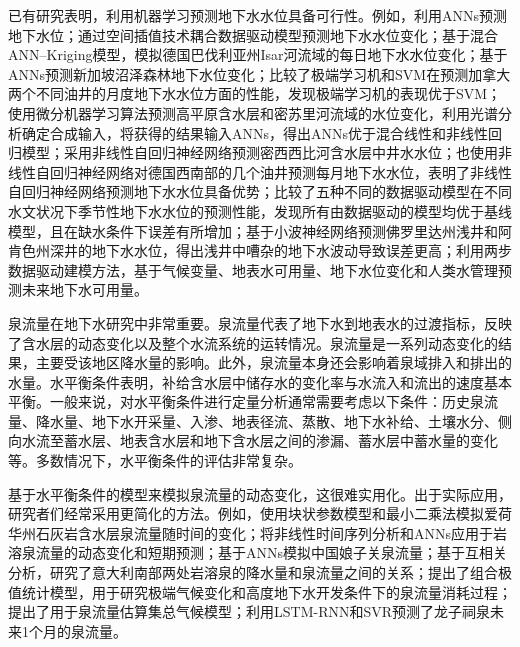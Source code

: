 已有研究表明，利用机器学习预测地下水水位具备可行性。例如，\citet{coppola2003artificial}利用ANNs预测地下水位；\citet{sun2013predicting}通过空间插值技术耦合数据驱动模型预测地下水水位变化；\citet{tapoglou2014spatio}基于混合ANN--Kriging模型，模拟德国巴伐利亚州Isar河流域的每日地下水水位变化；\citet{Sun2015Technical}基于ANNs预测新加坡沼泽森林地下水位变化；\citet{yadav2017assessing}比较了极端学习机和SVM在预测加拿大两个不同油井的月度地下水水位方面的性能，发现极端学习机的表现优于SVM；\citet{sahoo2017machine}使用微分机器学习算法预测高平原含水层和密苏里河流域的水位变化，利用光谱分析确定合成输入，将获得的结果输入ANNs，得出ANNs优于混合线性和非线性回归模型；\citet{guzman2017use}采用非线性自回归神经网络预测密西西比河含水层中井水水位；\citet{wunsch2018forecasting}也使用非线性自回归神经网络对德国西南部的几个油井预测每月地下水水位，表明了非线性自回归神经网络预测地下水水位具备优势；\citet{amaranto2018semi}比较了五种不同的数据驱动模型在不同水文状况下季节性地下水水位的预测性能，发现所有由数据驱动的模型均优于基线模型，且在缺水条件下误差有所增加；\citet{Rakhshandehroo2018Long}基于小波神经网络预测佛罗里达州浅井和阿肯色州深井的地下水水位，得出浅井中嘈杂的地下水波动导致误差更高；\citet{amaranto2019spatially}利用两步数据驱动建模方法，基于气候变量、地表水可用量、地下水位变化和人类水管理预测未来地下水可用量。

泉流量在地下水研究中非常重要\citep{toth1971groundwater,toth1999groundwater}。泉流量代表了地下水到地表水的过渡指标，反映了含水层的动态变化以及整个水流系统的运转情况。泉流量是一系列动态变化的结果，主要受该地区降水量的影响。此外，泉流量本身还会影响着泉域排入和排出的水量。水平衡条件表明，补给含水层中储存水的变化率与水流入和流出的速度基本平衡。一般来说，对水平衡条件进行定量分析通常需要考虑以下条件：历史泉流量、降水量、地下水开采量、入渗、地表径流、蒸散、地下水补给、土壤水分、侧向水流至蓄水层、地表含水层和地下含水层之间的渗漏、蓄水层中蓄水量的变化等。多数情况下，水平衡条件的评估非常复杂。

基于水平衡条件的模型来模拟泉流量的动态变化，这很难实用化。出于实际应用，研究者们经常采用更简化的方法。例如，\citet{zhang1996simulation}使用块状参数模型和最小二乘法模拟爱荷华州石灰岩含水层泉流量随时间的变化；\citet{lambrakis2000nonlinear}将非线性时间序列分析和ANNs应用于岩溶泉流量的动态变化和短期预测；\citet{hu2008simulation}基于ANNs模拟中国娘子关泉流量；\citet{fiorillo2010relation}基于互相关分析，研究了意大利南部两处岩溶泉的降水量和泉流量之间的关系；\citet{fan2013assembled}提出了组合极值统计模型，用于研究极端气候变化和高度地下水开发条件下的泉流量消耗过程；\citet{diodato2014predicting}提出了用于泉流量估算集总气候模型；\citet{cheng2021machine}利用LSTM-RNN和SVR预测了龙子祠泉未来1个月的泉流量。


